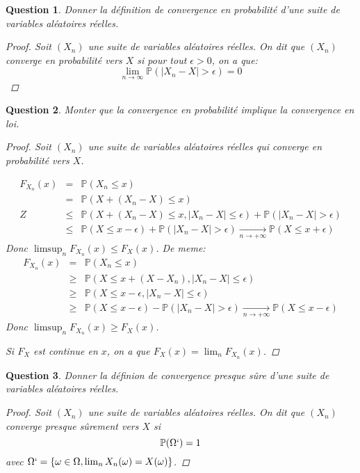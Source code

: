 \documentclass{article}
\theoremstyle{plain}
\newtheorem{question}{Question}
\begin{document}
\begin{question}
	Donner la définition de convergence en probabilité d'une suite de variables aléatoires réelles.
	\begin{proof}
		Soit $(X_n)$ une suite de variables aléatoires réelles. On dit que $(X_n)$ converge en probabilité vers $X$ si pour tout $\epsilon > 0$, on a que:
		\begin{equation*}
			\lim_{n \to \infty} \mathbb{P} (|X_n - X| > \epsilon) = 0
		\end{equation*}
	\end{proof}
\end{question}

\begin{question}
	Monter que la convergence en probabilité implique la convergence en loi.
	\begin{proof}
		Soit $(X_n)$ une suite de variables aléatoires réelles qui converge en probabilité vers $X$.

		\begin{eqnarray*}
			F_{X_n} (x) &=& \mathbb{P} (X_n \leq x) \\
			&=& \mathbb{P} (X + (X_n - X) \leq x) \\Z
			&\leq& \mathbb{P} (X+(X_n-X) \leq x, |X_n - X| \leq \epsilon) + \mathbb{P} (|X_n - X| > \epsilon) \\
			&\leq& \mathbb{P} (X \leq x - \epsilon) + \mathbb{P} (|X_n - X| > \epsilon) \underset{n\to +\infty}{\longrightarrow} \mathbb{P}(X \leq x + \epsilon)
		\end{eqnarray*}
		Donc $\limsup_n F_{X_n} (x) \leq F_X(x)$.
		De meme:
		\begin{eqnarray*}
			F_{X_n} (x) &=& \mathbb{P} (X_n \leq x) \\
			&\geq& \mathbb{P} (X \leq x + (X-X_n), |X_n - X| \leq \epsilon) \\
			&\geq& \mathbb{P} (X \leq x - \epsilon, |X_n - X| \leq \epsilon) \\
			&\geq& \mathbb{P} (X \leq x - \epsilon) - \mathbb{P} (|X_n - X| > \epsilon)  \underset{n\to +\infty}{\longrightarrow} \mathbb{P}(X \leq x - \epsilon)
		\end{eqnarray*}
		Donc $\limsup_n F_{X_n} (x) \geq F_X(x)$.

		Si $F_X$ est continue en $x$, on a que $F_X(x) = \lim_n F_{X_n} (x)$.
	\end{proof}
\end{question}

\begin{question}
	Donner la définion de convergence presque sûre d'une suite de variables aléatoires réelles.
	\begin{proof}
		Soit $(X_n)$ une suite de variables aléatoires réelles. On dit que $(X_n)$ converge presque sûrement vers $X$ si
		\begin{equation*}
			\mathbb{P} (\Omega`) = 1
		\end{equation*}
		avec $\Omega` = \{\omega \in \Omega, \lim_n X_n (\omega) = X(\omega)\}$.
	\end{proof}
\end{question}
\end{document}
